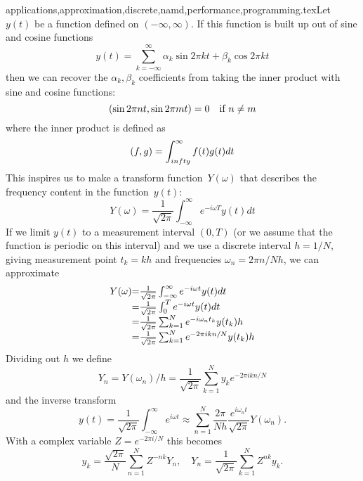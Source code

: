{applications,approximation,discrete,namd,performance,programming}.texLet $y(t)$ be a function defined on $(-\infty,\infty)$. If this
function is built up out of sine and cosine functions
\[ y(t) = \sum_{k=-\infty}^\infty \alpha_k \sin 2\pi kt
                + \beta_k \cos 2\pi kt
\] 
then we can recover the $\alpha_k,\beta_k$ coefficients from taking
the inner product with sine and cosine functions:
\[ (\sin 2\pi nt,\sin 2\pi mt)=0 \quad \hbox{if $n\not=m$} \]
where the inner product is defined as
\[ (f,g) = \int_{\-infty}^\infty f(t)g(t)dt \]
This inspires us to make a transform function~$Y(\omega)$ that
describes the frequency content in the function~$y(t)$:
\[ Y(\omega) = \frac 1{\sqrt{2\pi}}
    \int_{-\infty}^\infty e^{-i\omega T} y(t) dt
\]
If we limit $y(t)$ to a measurement interval $(0,T)$ (or we assume
that the function is periodic on this interval) and we use a discrete
interval $h=1/N$, giving measurement point $t_k=kh$ and frequencies
$\omega_n = 2\pi n/Nh$,
we can approximate
\[ 
\begin{array}{r@{=}l}
  Y(\omega) 
  & \frac 1{\sqrt{2\pi}} \int_{-\infty}^\infty e^{-i\omega t} y(t) dt\\
  & \frac 1{\sqrt{2\pi}} \int_0^T e^{-i\omega t} y(t) dt\\
  & \frac 1{\sqrt{2\pi}} \sum_{k=1}^N  e^{-i\omega_nt_k} y(t_k) h\\
  & \frac 1{\sqrt{2\pi}} \sum_{k=1}^N  e^{-2\pi ikn/N} y(t_k) h\\
\end{array}
\]
Dividing out $h$ we define
\[ Y_n = Y(\omega_n)/h = \frac1{\sqrt{2\pi}} 
        \sum_{k=1}^N y_k e^{-2\pi ikn/N}
\]
and the inverse transform
\[ y(t) = \frac1{\sqrt{2\pi}} \int_{-\infty}^\infty e^{i\omega t}
    \approx \sum_{n=1}^N \frac{2\pi}{Nh} \frac{e^{i\omega_n
        t}}{\sqrt{2\pi}}
    Y(\omega_n).
\]
With a complex variable $Z=e^{-2\pi i/N}$ this becomes
\[ y_k = \frac{\sqrt{2\pi}}N \sum_{n=1}^N Z^{-nk} Y_n, \quad
    Y_n = \frac1{\sqrt{2\pi}} \sum_{k=1}^N Z^{nk} y_k.
\]

